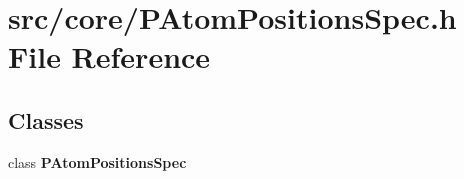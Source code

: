 \section{src/core/PAtom\-Positions\-Spec.h File Reference}
\label{PAtomPositionsSpec_8h}


\subsection*{Classes}
\begin{CompactItemize}
\item 
class {\bf PAtom\-Positions\-Spec}
\end{CompactItemize}
